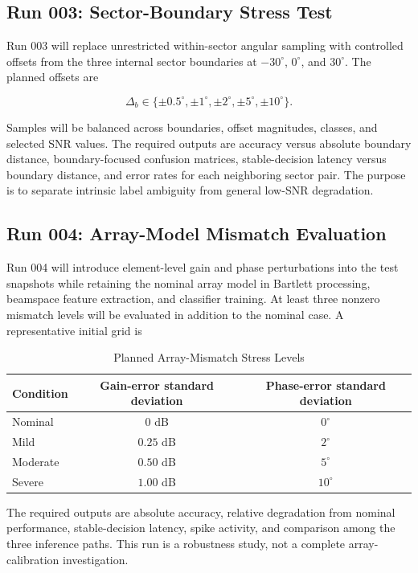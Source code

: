 \subsection{Run 003: Sector-Boundary Stress Test}

Run 003 will replace unrestricted within-sector angular sampling with controlled offsets from the three internal sector boundaries at $-30^{\circ}$, $0^{\circ}$, and $30^{\circ}$. The planned offsets are

\[
\Delta_b \in \{\pm 0.5^{\circ},\pm 1^{\circ},\pm 2^{\circ},\pm 5^{\circ},\pm 10^{\circ}\}.
\]

Samples will be balanced across boundaries, offset magnitudes, classes, and selected SNR values. The required outputs are accuracy versus absolute boundary distance, boundary-focused confusion matrices, stable-decision latency versus boundary distance, and error rates for each neighboring sector pair. The purpose is to separate intrinsic label ambiguity from general low-SNR degradation.

\subsection{Run 004: Array-Model Mismatch Evaluation}

Run 004 will introduce element-level gain and phase perturbations into the test snapshots while retaining the nominal array model in Bartlett processing, beamspace feature extraction, and classifier training. At least three nonzero mismatch levels will be evaluated in addition to the nominal case. A representative initial grid is

\begin{table}[H]
\centering
\caption{Planned Array-Mismatch Stress Levels}
\label{tab:array_mismatch_levels}
\begin{tabular}{lcc}
\toprule
Condition & Gain-error standard deviation & Phase-error standard deviation \\
\midrule
Nominal & $0$ dB & $0^{\circ}$ \\
Mild & $0.25$ dB & $2^{\circ}$ \\
Moderate & $0.50$ dB & $5^{\circ}$ \\
Severe & $1.00$ dB & $10^{\circ}$ \\
\bottomrule
\end{tabular}
\end{table}

The required outputs are absolute accuracy, relative degradation from nominal performance, stable-decision latency, spike activity, and comparison among the three inference paths. This run is a robustness study, not a complete array-calibration investigation.

